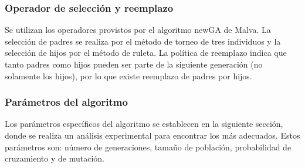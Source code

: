 \subsubsection{Operador de selección y reemplazo}
Se  utilizan los operadores provistos por el algoritmo newGA de Malva. La selección de padres se realiza por el método de torneo de tres individuos y la selección de hijos por el método de ruleta. La política de reemplazo indica que tanto padres como hijos pueden ser parte de la siguiente generación (no solamente los hijos), por lo que existe reemplazo de padres por hijos.

\subsubsection{Parámetros del algoritmo}
Los parámetros específicos del algoritmo se establecen en la siguiente sección, donde se realiza un análisis experimental para encontrar los más adecuados. Estos parámetros son: número de generaciones, tamaño de población, probabilidad de cruzamiento y de mutación.